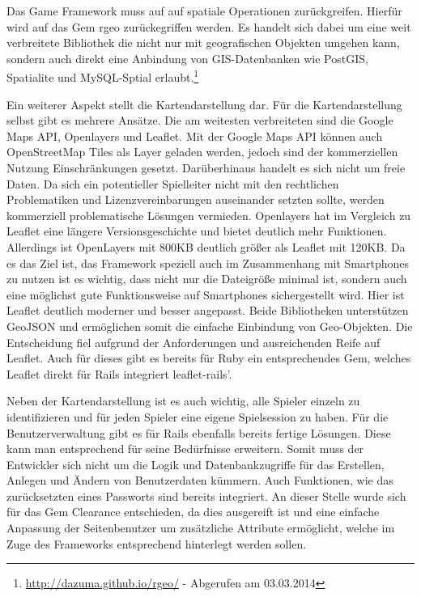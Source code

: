 Das Game Framework muss auf auf spatiale Operationen zurückgreifen. Hierfür wird auf das Gem \glqq rgeo\grqq{} zurückegriffen werden. Es handelt sich dabei um eine weit verbreitete Bibliothek die nicht nur mit geografischen Objekten umgehen kann, sondern auch direkt eine Anbindung von GIS-Datenbanken wie PostGIS, Spatialite und MySQL-Sptial erlaubt.\footnote{\url{http://dazuma.github.io/rgeo/} - Abgerufen am 03.03.2014}

Ein weiterer Aspekt stellt die Kartendarstellung dar. Für die Kartendarstellung selbst gibt es mehrere Ansätze. Die am weitesten verbreiteten sind die Google Maps API, Openlayers und Leaflet.\cite{Derrough.2013} Mit der Google Maps API können auch OpenStreetMap Tiles als Layer geladen werden, jedoch sind der kommerziellen Nutzung Einschränkungen gesetzt. Darüberhinaus handelt es sich nicht um freie Daten. Da sich ein potentieller Spielleiter nicht mit den rechtlichen Problematiken und Lizenzvereinbarungen auseinander setzten sollte, werden kommerziell problematische Lösungen vermieden. Openlayers hat im Vergleich zu Leaflet eine längere Versionsgeschichte und bietet deutlich mehr Funktionen.\cite{Ohloh.2014} Allerdings ist OpenLayers mit 800KB deutlich größer als Leaflet mit 120KB. Da es das Ziel ist, das Framework speziell auch im Zusammenhang mit Smartphones zu nutzen ist es wichtig, dass nicht nur die Dateigröße minimal ist, sondern auch eine möglichst gute Funktionsweise auf Smartphones sichergestellt wird. Hier ist Leaflet deutlich moderner und besser angepasst. Beide Bibliotheken unterstützen GeoJSON und ermöglichen somit die einfache Einbindung von Geo-Objekten. Die Entscheidung fiel aufgrund der Anforderungen und ausreichenden Reife auf Leaflet. Auch für dieses gibt es bereits für Ruby ein entsprechendes Gem, welches Leaflet direkt für Rails integriert \glqq leaflet-rails'.

Neben der Kartendarstellung ist es auch wichtig, alle Spieler einzeln zu identifizieren und für jeden Spieler eine eigene \glqq Spielsession\grqq{} zu haben. Für die Benutzerverwaltung gibt es für Rails ebenfalls bereits fertige Lösungen. Diese kann man entsprechend für seine Bedürfnisse erweitern. Somit muss der Entwickler sich nicht um die Logik und Datenbankzugriffe für das Erstellen, Anlegen und Ändern von Benutzerdaten kümmern. Auch Funktionen, wie das zurücksetzten eines Passworts sind bereits integriert. An dieser Stelle wurde sich für das Gem \glqq Clearance\grqq{} entschieden, da dies ausgereift ist und eine einfache Anpassung der Seitenbenutzer um zusätzliche Attribute ermöglicht, welche im Zuge des Frameworks entsprechend hinterlegt werden sollen.

